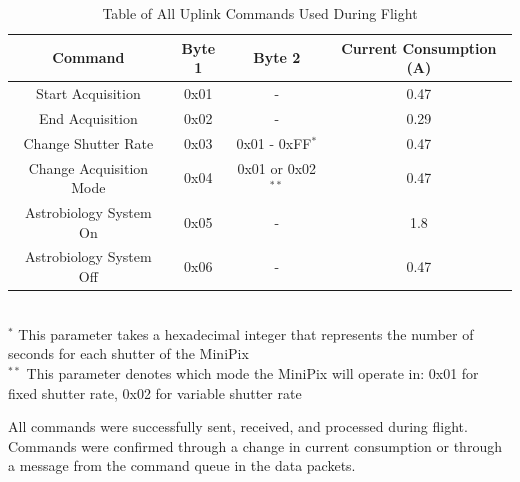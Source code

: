 \begin{table}[H]
\centering
\caption{Table of All Uplink Commands Used During Flight}
\label{tab:All-Commands}
\bigskip
\begin{tabular}{c|c|c|c}
\hline
\hline
\multicolumn{1}{c|}{\bfseries Command} & \multicolumn{1}{c|}{\bfseries Byte 1} &  \multicolumn{1}{c|}{\bfseries Byte 2} & \multicolumn{1}{c}{\bfseries Current Consumption (A)} \\
\hline
	Start Acquisition  		& 0x01	& -	 					& 0.47    \\ \hline
	End Acquisition 		& 0x02	& -	 					& 0.29    \\ \hline
	Change Shutter Rate 	& 0x03 	& 0x01 - 0xFF$^*$		& 0.47 		\\ \hline
	Change Acquisition Mode	& 0x04	& 0x01 or 0x02$^{**}$	& 0.47		\\ \hline
	Astrobiology System On	& 0x05	& -						& 1.8			\\ \hline
	Astrobiology System Off	& 0x06	& -						& 0.47		\\ \hline
\end{tabular}
\\
\footnotesize
$^{*}$ 	This parameter takes a hexadecimal integer that represents the number of seconds for each shutter of the MiniPix \\
$^{**}$	This parameter denotes which mode the MiniPix will operate in: 0x01 for fixed shutter rate, 0x02 for variable shutter rate
\end{table}

All commands were successfully sent, received, and processed during flight. Commands were confirmed through  
a change in current consumption or through a message from the command queue in the data packets. 